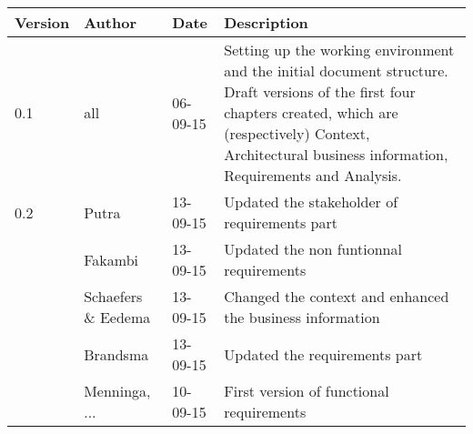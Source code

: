 \begin{longtable}{L{} L{} L{} L{}}
	\textbf{Version} & \textbf{Author}       & \textbf{Date} & \textbf{Description}                                                                                                                                                                                                       \\
			
	\toprule
	0.1              & all                   & 06-09-15      & Setting up the working environment and the initial document structure. Draft versions of the first four chapters created, which are (respectively) Context, Architectural business information, Requirements and Analysis. \\
	\midrule
			
	0.2              & Putra                 & 13-09-15      & Updated the stakeholder of requirements part                                                                                                                                                                               \\
					 & Fakambi 				& 13-09-15  	 & Updated the non funtionnal requirements \\
					 & Schaefers \& Eedema   & 13-09-15      & Changed the context and enhanced the business information                                                                                                                                                                  \\
					 & Brandsma              & 13-09-15      & Updated the requirements part                                                                                                                                                                                              \\  
					 & Menninga, ...         & 10-09-15      & First version of functional requirements                                                                                                                                                                                   \\ 	                 
	\midrule
			

\end{longtable}
